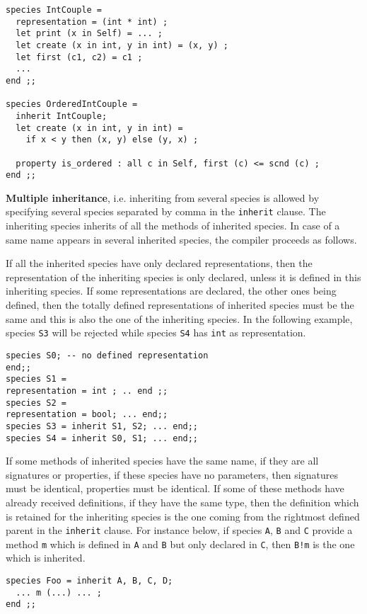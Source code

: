  {\scriptsize
\begin{lstlisting}
species IntCouple =
  representation = (int * int) ;
  let print (x in Self) = ... ;
  let create (x in int, y in int) = (x, y) ;
  let first (c1, c2) = c1 ; 
  ...
end ;;

species OrderedIntCouple =
  inherit IntCouple;
  let create (x in int, y in int) =
    if x < y then (x, y) else (y, x) ;

  property is_ordered : all c in Self, first (c) <= scnd (c) ;
end ;;
\end{lstlisting}
}




\smallskip
{}
{\bf Multiple inheritance}, i.e. inheriting from several species is
allowed by specifying several species separated by comma in the
{\tt inherit} clause. The inheriting species inherits of all the
methods of inherited species. In case of a same name appears in
several inherited species, the compiler proceeds as follows. 

If all the inherited species have only declared representations, then
the representation of the inheriting species is only declared, unless
it is defined in this inheriting species. If some representations are
declared, the other ones being defined, then the totally defined
representations of inherited species must be the same and this is also
the one of the inheriting species. In the following example, species
{\tt S3} will be rejected while species {\tt S4} has {\tt int} as
representation.

{\scriptsize
\begin{lstlisting}
species S0; -- no defined representation
end;; 
species S1 =
representation = int ; .. end ;;
species S2 =
representation = bool; ... end;;
species S3 = inherit S1, S2; ... end;;
species S4 = inherit S0, S1; ... end;;
\end{lstlisting}
}

If some methods of inherited species have the same name, if they are
all signatures or properties, if these species have no parameters,
then signatures must be identical, properties must be identical. If
some of these methods have already received definitions, if they have
the same type, then the definition which is retained for the
inheriting species is the one coming from the rightmost defined parent
in the {\tt inherit} clause. For instance below, if species {\tt A},
{\tt B} 
and {\tt C} provide a method {\tt m} which is defined in {\tt A} and
{\tt B} but only declared in {\tt C}, then {\tt B!m} is the one which
is inherited.
{\scriptsize
\begin{lstlisting}
species Foo = inherit A, B, C, D;
  ... m (...) ... ;
end ;;
\end{lstlisting}
}

